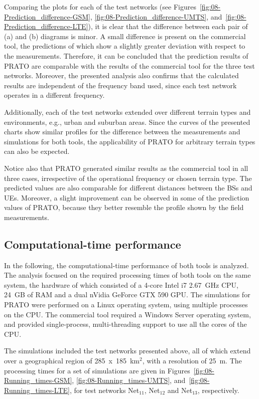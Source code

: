 Comparing the plots for each of the test networks (see Figures~\ref{fig:08-Prediction_difference-GSM},
\ref{fig:08-Prediction_difference-UMTS}, and~\ref{fig:08-Prediction_difference-LTE}),
it is clear that the difference between each pair of (a) and (b) diagrams
is minor. A small difference is present on the commercial tool, the
predictions of which show a slightly greater deviation with respect
to the measurements. Therefore, it can be concluded that the prediction
results of PRATO are comparable with the results of the commercial
tool for the three test networks. Moreover, the presented analysis
also confirms that the calculated results are independent of the frequency
band used, since each test network operates in a different frequency.

Additionally, each of the test networks extended over different terrain
types and environments, e.g., urban and suburban areas. Since the
curves of the presented charts show similar profiles for the difference
between the measurements and simulations for both tools, the applicability
of PRATO for arbitrary terrain types can also be expected.

Notice also that PRATO generated similar results as the commercial
tool in all three cases, irrespective of the operational frequency
or chosen terrain type. The predicted values are also comparable for
different distances between the BSs and UEs. Moreover, a slight improvement
can be observed in some of the prediction values of PRATO, because
they better resemble the profile shown by the field measurements.


\subsection*{Computational-time performance}

In the following, the computational-time performance of both tools
is analyzed. The analysis focused on the required processing times
of both tools on the same system, the hardware of which consisted
of a 4-core Intel i7 2.67~GHz CPU, 24~GB of RAM and a dual nVidia
GeForce GTX 590 GPU. The simulations for PRATO were performed on a
Linux operating system, using multiple processes on the CPU. The commercial
tool required a Windows Server operating system, and provided single-process,
multi-threading support to use all the cores of the CPU.

The simulations included the test networks presented above, all of
which extend over a geographical region of 285~x~185~km$^{2}$,
with a resolution of 25~m. The processing times for a set of simulations
are given in Figures~\ref{fig:08-Running_times-GSM}, \ref{fig:08-Running_times-UMTS},
and~\ref{fig:08-Running_times-LTE}, for test networks Net$_{11}$,
Net$_{12}$ and Net$_{13}$, respectively.

